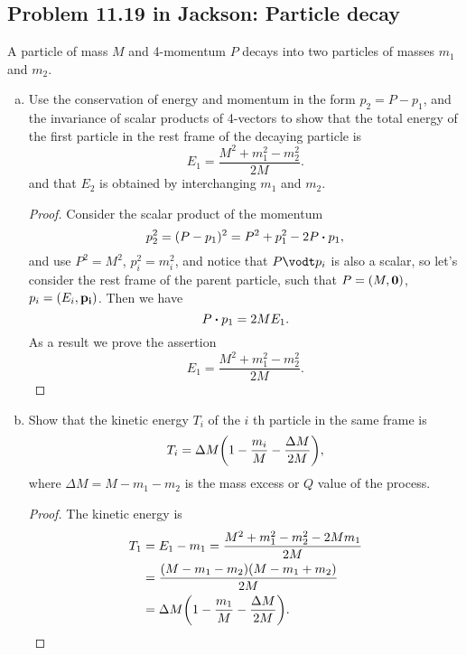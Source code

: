 \documentclass[10pt]{article}
\begin{document}
\subsection{Problem 11.19 in Jackson: Particle decay}
A particle of mass $M$ and 4-momentum $P$ decays into two particles of masses $m_1$ and $m_2$.
\begin{enumerate}[(a)]
	\item Use the conservation of energy and momentum in the form $p_2= P - p_1$, and the invariance of scalar products of 4-vectors to show that the total energy of the first particle in the rest frame of the decaying particle is 
		\begin{equation}
			E_1 = \frac{M^2 + m_1^2 - m_2^2}{2M}.
		\end{equation}
		and that $E_2$ is obtained by interchanging $m_1$ and $m_2$. 

	\begin{proof}
		Consider the scalar product of the momentum
		\begin{equation}
			p_2^2 = (P - p_1)^2 = P^2 + p_1^2 - 2P\vdot p_1,
		\end{equation}
		and use $P^2 = M^2$, $p_i^2 = m_i^2$, and notice that $P \vodt p_i$ is also a scalar, so let's consider the rest frame of the parent particle, such that $P = (M, \vb{0})$, $p_i = (E_i, \vb{p_i})$. Then we have 
		\begin{equation}
			P \vdot p_1 = 2M E_1.
		\end{equation}
		As a result we prove the assertion 
		\begin{equation}
			E_1 = \frac{M^2 + m_1^2 - m_2^2}{2M}.
		\end{equation}
	\end{proof}	
	\item Show that the kinetic energy $T_i$ of the $i$ th particle in the same frame is 
		\begin{equation}
			T_i = \Delta M \qty(1 - \frac{m_i}{M} - \frac{\Delta M}{2M}),
		\end{equation}
		where $\Delta M = M - m_1 - m_2$ is the mass excess or $Q$ value of the process.
		\begin{proof}
			The kinetic energy is 
			\begin{align*}
				T_1 &= E_1 - m_1 = \frac{M^2 + m_1^2 - m_2^2 - 2M m_1}{2M} \\
					&= \frac{(M-m_1-m_2)(M-m_1+m_2)}{2M} \\
					&= \Delta M \qty(1 - \frac{m_1}{M} - \frac{\Delta M}{2M}).
			\end{align*}
		\end{proof}
\end{enumerate}
\end{document}
